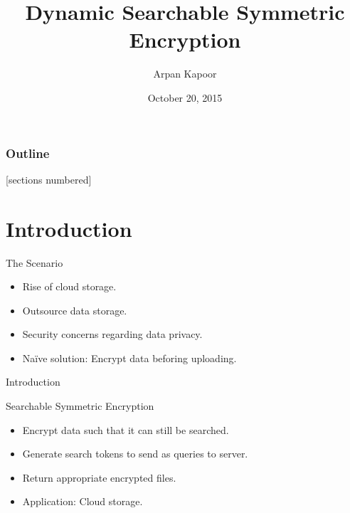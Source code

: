 \documentclass{beamer}
\title{Dynamic Searchable Symmetric Encryption}
\author{Arpan Kapoor}
\institute{National Institute of Technology, Calicut}
\date{October 20, 2015}
\begin{document}
\maketitle

\begin{frame}
	\frametitle{Outline}
	[sections numbered]
	\tableofcontents
\end{frame}

\section{Introduction}
\begin{frame}{The Scenario}
\begin{itemize}
\item Rise of cloud storage.
\item Outsource data storage.
\item Security concerns regarding data privacy.
\item Na{\"i}ve solution: Encrypt data beforing uploading.
\end{itemize}
\end{frame}

\begin{frame}{Introduction}
\begin{block}{Searchable Symmetric Encryption}
\begin{itemize}
\item Encrypt data such that it can still be searched.
\item Generate search tokens to send as queries to server.
\item Return appropriate encrypted files.
\item Application: Cloud storage.
\end{itemize}
\end{block}
\end{frame}
\end{document}
